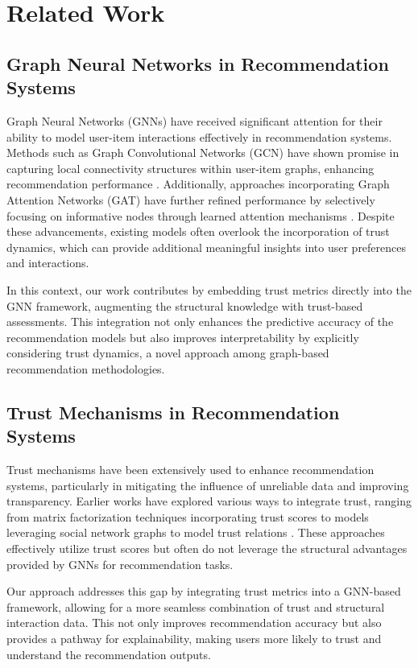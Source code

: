 \section{Related Work}

\subsection{Graph Neural Networks in Recommendation Systems}
Graph Neural Networks (GNNs) have received significant attention for their ability to model user-item interactions effectively in recommendation systems. Methods such as Graph Convolutional Networks (GCN) have shown promise in capturing local connectivity structures within user-item graphs, enhancing recommendation performance \cite{kipf2017semi, berg2018graph, wu2019neural}. Additionally, approaches incorporating Graph Attention Networks (GAT) have further refined performance by selectively focusing on informative nodes through learned attention mechanisms \cite{velickovic2018graph, wang2019inductive}. Despite these advancements, existing models often overlook the incorporation of trust dynamics, which can provide additional meaningful insights into user preferences and interactions.

In this context, our work contributes by embedding trust metrics directly into the GNN framework, augmenting the structural knowledge with trust-based assessments. This integration not only enhances the predictive accuracy of the recommendation models but also improves interpretability by explicitly considering trust dynamics, a novel approach among graph-based recommendation methodologies.

\subsection{Trust Mechanisms in Recommendation Systems}
Trust mechanisms have been extensively used to enhance recommendation systems, particularly in mitigating the influence of unreliable data and improving transparency. Earlier works have explored various ways to integrate trust, ranging from matrix factorization techniques incorporating trust scores \cite{guo2017trust, massa2007trust, lathia2008trust} to models leveraging social network graphs to model trust relations \cite{konstas2009social, ma2011recommender}. These approaches effectively utilize trust scores but often do not leverage the structural advantages provided by GNNs for recommendation tasks.

Our approach addresses this gap by integrating trust metrics into a GNN-based framework, allowing for a more seamless combination of trust and structural interaction data. This not only improves recommendation accuracy but also provides a pathway for explainability, making users more likely to trust and understand the recommendation outputs.

